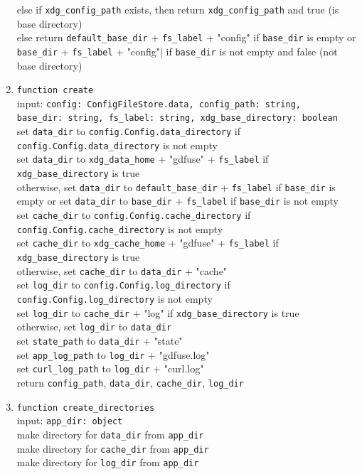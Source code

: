 \begin{enumerate}
    else if \verb|xdg_config_path| exists, then return \verb|xdg_config_path| and true (is base directory) \\
    else return \verb|default_base_dir| + \verb|fs_label| + "config" if \verb|base_dir| is empty or \verb|base_dir| + \verb|fs_label| + "config"| if \verb|base_dir| is not empty and false (not base directory)
    \item \verb|function create| \\
    input: \verb|config: ConfigFileStore.data, config_path: string,| \\ \verb|base_dir: string, fs_label: string, xdg_base_directory: boolean| \\
    set \verb|data_dir| to \verb|config.Config.data_directory| if \verb|config.Config.data_directory| is not empty \\
    set \verb|data_dir| to \verb|xdg_data_home| + "gdfuse" + \verb|fs_label| if \verb|xdg_base_directory| is true \\
    otherwise, set \verb|data_dir| to \verb|default_base_dir| + \verb|fs_label| if \verb|base_dir| is empty or set \verb|data_dir| to \verb|base_dir| + \verb|fs_label| if \verb|base_dir| is not empty \\
    set \verb|cache_dir| to \verb|config.Config.cache_directory| if \verb|config.Config.cache_directory| is not empty \\
    set \verb|cache_dir| to \verb|xdg_cache_home| + "gdfuse" + \verb|fs_label| if \verb|xdg_base_directory| is true \\
    otherwise, set \verb|cache_dir| to \verb|data_dir| + "cache" \\
    set \verb|log_dir| to \verb|config.Config.log_directory| if \verb|config.Config.log_directory| is not empty \\
    set \verb|log_dir| to \verb|cache_dir| + "log" if \verb|xdg_base_directory| is true \\
    otherwise, set \verb|log_dir| to \verb|data_dir| \\
    set \verb|state_path| to \verb|data_dir| + "state" \\
    set \verb|app_log_path| to \verb|log_dir| + "gdfuse.log" \\
    set \verb|curl_log_path| to \verb|log_dir| + "curl.log" \\
    return \verb|config_path|, \verb|data_dir|, \verb|cache_dir|, \verb|log_dir|
    \item \verb|function create_directories| \\
    input: \verb|app_dir: object| \\
    make directory for \verb|data_dir| from \verb|app_dir| \\
    make directory for \verb|cache_dir| from \verb|app_dir| \\
    make directory for \verb|log_dir| from \verb|app_dir| \\
\end{enumerate}
